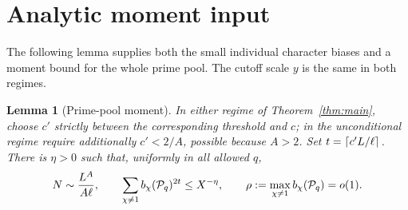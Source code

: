\documentclass[11pt]{article}
\newtheorem{lemma}[theorem]{Lemma}
\theoremstyle{remark}\newtheorem{remark}[theorem]{Remark}
\begin{document}
\section{Analytic moment input}
\label{sec:analytic}
The following lemma supplies both the small individual character biases and a moment bound for the whole prime pool. The cutoff scale $y$ is the same in both regimes.
\begin{lemma}[Prime-pool moment]\label{lem:analytic}
In either regime of Theorem~\ref{thm:main}, choose $c'$ strictly between the corresponding threshold and $c$; in the unconditional regime require additionally $c'<2/A$, possible because $A>2$. Set $t=\lceil c'L/\ell\rceil$. There is $\eta>0$ such that, uniformly in all allowed $q$,
\begin{equation}\label{eq:moment}
 N\sim \frac{L^A}{A\ell},\qquad
 \sum_{\chi\ne1} b_\chi(\mathcal P_q)^{2t}\le X^{-\eta},\qquad
 \rho:=\max_{\chi\ne1} b_\chi(\mathcal P_q)=o(1).
\end{equation}
\end{lemma}
\end{document}
